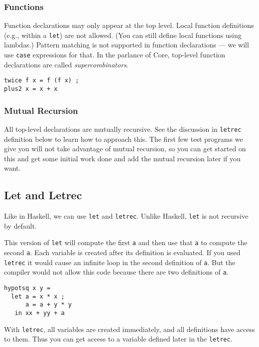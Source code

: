 \documentclass[11pt]{article}
\begin{document}
\subsubsection{Functions}
\label{sec:org45509a5}

Function declarations may only appear at the top level. Local function definitions (e.g., within a \texttt{let}) are not
allowed.  (You can still define local functions using lambdas.)  Pattern matching is not supported in function
declarations --- we will use \texttt{case} expressions for that.  In the parlance of Core, top-level function declarations are
called \emph{supercombinators}.

\begin{verbatim}
twice f x = f (f x) ;
plus2 x = x + x
\end{verbatim}
\subsubsection{Mutual Recursion}
\label{sec:org9a21ca5}

All top-level declarations are mutually recursive.  See the discussion in \texttt{letrec} definition below to learn how to approach
this.  The first few test programs we give you will not take advantage of mutual recursion, so you can get started on this
and get some initial work done and add the mutual recursion later if you want.
\subsection{Let and Letrec}
\label{sec:org7e6ee98}

Like in Haskell, we can use \texttt{let} and \texttt{letrec}.  Unlike Haskell, \texttt{let} is not recursive by default.

This version of \texttt{let} will compute the first \texttt{a} and then use that \texttt{a} to compute the second \texttt{a}.  Each variable is created after
its definition is evaluated.  If you used \texttt{letrec} it would cause an infinite loop in the second definition of \texttt{a}.  But the compiler
would not allow this code because there are two definitions of \texttt{a}.

\begin{verbatim}
hypotsq x y =
  let a = x * x ;
      a = a + y * y
   in xx + yy + a
\end{verbatim}

With \texttt{letrec}, all variables are created immediately, and all definitions have access to them.  Thus you can get access to a variable
defined later in the \texttt{letrec}.
\end{document}
